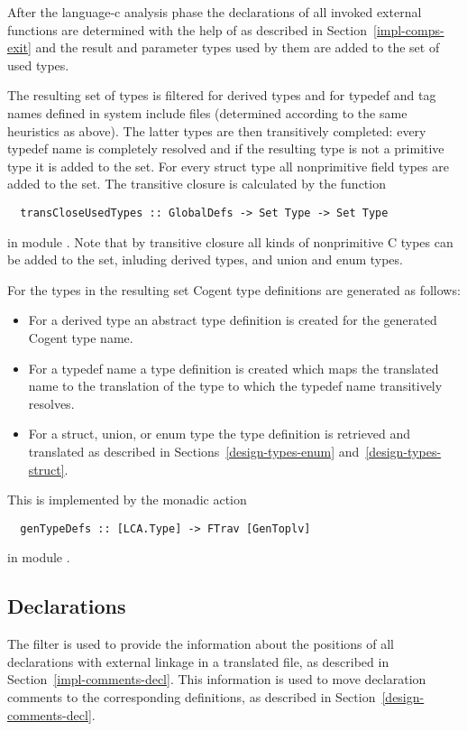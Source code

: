 After the language-c analysis phase the declarations of all invoked external functions are determined with the
help of  as described in Section~\ref{impl-comps-exit} and the result and parameter 
types used by them are added to the set of used types.

The resulting set of types is filtered for derived types and for typedef and tag names defined in system include files
(determined according to the same heuristics as above). The latter types are then transitively completed: every typedef 
name is completely resolved and if the resulting type is not a primitive type it is added to the set. For every struct
type all nonprimitive field types are added to the set. The transitive closure is calculated by the function
\begin{verbatim}
  transCloseUsedTypes :: GlobalDefs -> Set Type -> Set Type
\end{verbatim}
in module . Note that by transitive closure all kinds of nonprimitive C types can be added to
the set, inluding derived types, and union and enum types.

For the types in the resulting set Cogent type definitions are generated as follows:
\begin{itemize}
\item For a derived type an abstract type definition is created for the generated Cogent type name.
\item For a typedef name a type definition is created which maps the translated name to the translation of the type
to which the typedef name transitively resolves.
\item For a struct, union, or enum type the type definition is retrieved and translated as described in 
Sections~\ref{design-types-enum} and~\ref{design-types-struct}.
\end{itemize}
This is implemented by the monadic action
\begin{verbatim}
  genTypeDefs :: [LCA.Type] -> FTrav [GenToplv]
\end{verbatim}
in module .



\subsection{Declarations}
\label{impl-comps-decls}

The filter  is used to provide the information about the positions of all declarations with
external linkage in
a translated file, as described in Section~\ref{impl-comments-decl}. This information is used to move declaration
comments to the corresponding definitions, as described in Section~\ref{design-comments-decl}.

